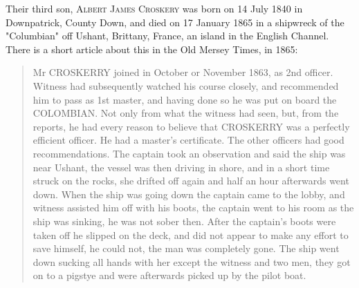 Their third son, \textsc{Albert James Croskery} was born on	14 July 1840 in	Downpatrick, County Down, and died on	17 January 1865 in a shipwreck of the "Columbian" off Ushant, Brittany, France, an island in the English Channel. There is a short article about this in the Old Mersey Times, in 1865:
\begin{quotation}

Mr CROSKERRY joined in October or November 1863, as 2nd officer. Witness had subsequently watched his course closely, and recommended him to pass as 1st master, and having done so he was put on board the COLOMBIAN. Not only from what the witness had seen, but, from the reports, he had every reason to believe that CROSKERRY was a perfectly efficient officer. He had a master's certificate. The other officers had good recommendations.
The captain took an observation and said the ship was near Ushant, the vessel was then driving in shore, and in a short time struck on the rocks, she drifted off again and half an hour afterwards went down. When the ship was going down the captain came to the lobby, and witness assisted him off with his boots, the captain went to his room as the ship was sinking, he was not sober then. After the captain's boots were taken off he slipped on the deck, and did not appear to make any effort to save himself, he could not, the man was completely gone. The ship went down sucking all hands with her except the witness and two men, they got on to a pigstye and were afterwards picked up by the pilot boat.
\end{quotation}






    



